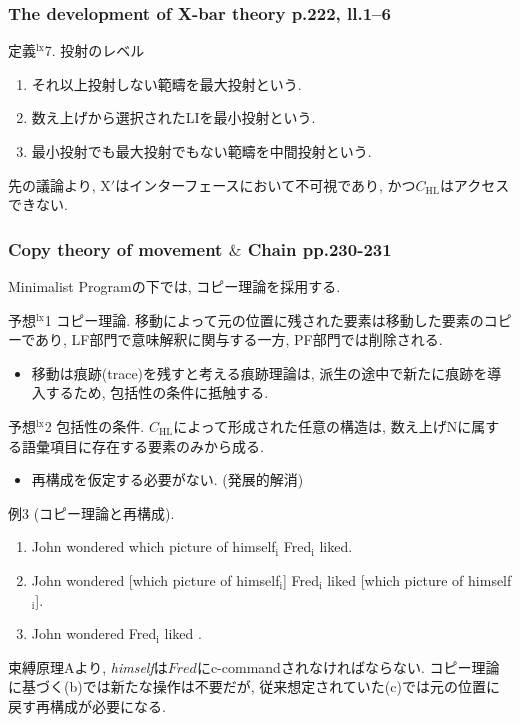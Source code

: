 \documentclass[dvipdfmx, xcolor={dvipsnames},12pt]{beamer}
\begin{document}
\begin{frame}
\frametitle{The development of X-bar theory p.222, ll.1--6}
\begin{Def}{定義$^\text{lx}$7. 投射のレベル}
\begin{enumerate}
\item[(i)] それ以上投射しない範疇を最大投射という.
\item[(ii)] 数え上げから選択されたLIを最小投射という.
\item[(iii)] 最小投射でも最大投射でもない範疇を中間投射という.
\end{enumerate}
\end{Def}
先の議論より, X$'$はインターフェースにおいて不可視であり, かつ$C_\mathrm{HL}$はアクセスできない.
\end{frame}

\begin{frame}
\frametitle{Copy theory of movement $\&$ Chain pp.230-231}
Minimalist Programの下では, コピー理論を採用する.
\begin{Rem}{予想$^\text{lx}$1 コピー理論.}
移動によって元の位置に残された要素は移動した要素のコピーであり, LF部門で意味解釈に関与する一方, PF部門では削除される.
\end{Rem}

\begin{itemize}
\item 移動は痕跡(trace)を残すと考える痕跡理論は, 派生の途中で新たに痕跡を導入するため, 包括性の条件に抵触する.
\end{itemize}

\begin{Rem}{予想$^\text{lx}$2 包括性の条件.}
$C_{\mathrm{HL}}$によって形成された任意の構造は, 数え上げNに属する語彙項目に存在する要素のみから成る.
\end{Rem}
\end{frame}


\begin{frame}
\begin{itemize}
\item 再構成を仮定する必要がない. (発展的解消)
\end{itemize}

\begin{Ex}{例3 (コピー理論と再構成).}
\begin{enumerate}
\item[(a)] John wondered which picture of himself$_\text{i}$ Fred$_\text{i}$ liked.

\item[(b)] John wondered [which picture of himself$_\text{i}$] Fred$_\text{i}$ liked [which picture of himself$_\text{i}$].

\item[(c)] John wondered  Fred$_\text{i}$ liked .
\end{enumerate}
束縛原理Aより, \textit{himself}は${Fred}$にc-commandされなければならない. コピー理論に基づく(b)では新たな操作は不要だが, 従来想定されていた(c)では元の位置に戻す再構成が必要になる. 
\end{Ex}
\end{frame}
\end{document}
